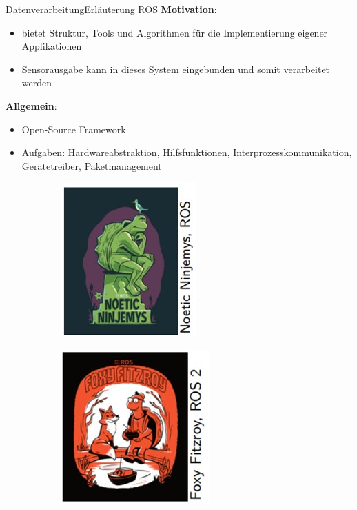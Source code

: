 \documentclass[169, handout	]{THIbeamer} %
\begin{document}
	\begin{frame}{Datenverarbeitung}{Erläuterung ROS}				
		\textbf{Motivation}: 
		\begin{itemize}
			\item bietet Struktur, Tools und Algorithmen für die Implementierung eigener Applikationen
			\item Sensorausgabe kann in dieses System eingebunden und somit verarbeitet werden
		\end{itemize}		
		\textbf{Allgemein}:
		\begin{itemize}
			\item Open-Source Framework
			\item Aufgaben: Hardwareabstraktion, Hilfsfunktionen, Interprozesskommunikation, Gerätetreiber, Paketmanagement
		\end{itemize}		
		\begin{figure}
			\centering
    		\begin{subfigure}[b]{0.2\textwidth}
				\includegraphics[scale=0.35]{required/ROS.jpg}
        		\label{ROS}
   		 	\end{subfigure}
    		\begin{subfigure}[b]{0.2\textwidth}
				\includegraphics[scale=0.35]{required/ROS2.jpg}
        		\label{ROS}
    		\end{subfigure}
		\end{figure}			
	\end{frame}
\end{document}

